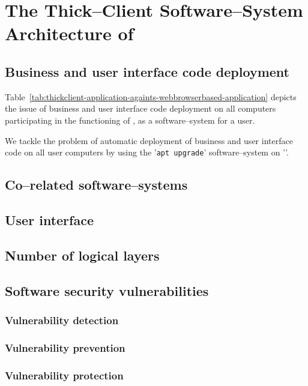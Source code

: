 \chapter{The Thick--Client Software--System Architecture of \yerotherpblack}


\section{Business and user interface code deployment}

Table~\ref{tab:thickclient-application-againts-webbrowserbased-application}
depicts the issue of business and user
interface code deployment on all computers
participating in the functioning of \yerotherpblack,
as a software--system for a user.

We tackle the problem of automatic deployment of
business and user interface code on all user
computers by using the '\texttt{apt upgrade}'
software--system on '\debianlinux'.

\section{Co--related software--systems}


\section{User interface}


\section{Number of logical layers}


\section{Software security vulnerabilities}

\subsection{Vulnerability detection}

\subsection{Vulnerability prevention}

\subsection{Vulnerability protection}